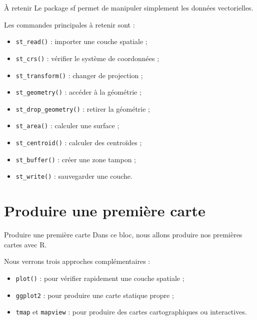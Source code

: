 \documentclass[
  10pt,
  ignorenonframetext,
]{beamer}
\begin{document}
\begin{frame}{À retenir}
\label{uxe0-retenir}
Le package sf permet de manipuler simplement les données vectorielles.

Les commandes principales à retenir sont :

\begin{itemize}
  \item \texttt{st\_read()} : importer une couche spatiale ;
  \item \texttt{st\_crs()} : vérifier le système de coordonnées ;
  \item \texttt{st\_transform()} : changer de projection ;
  \item \texttt{st\_geometry()} : accéder à la géométrie ;
  \item \texttt{st\_drop\_geometry()} : retirer la géométrie ;
  \item \texttt{st\_area()} : calculer une surface ;
  \item \texttt{st\_centroid()} : calculer des centroïdes ;
  \item \texttt{st\_buffer()} : créer une zone tampon ;
  \item \texttt{st\_write()} : sauvegarder une couche.
\end{itemize}
\end{frame}

\section{Produire une première
carte}\label{produire-une-premiuxe8re-carte}

\begin{frame}{Produire une première carte}
\label{produire-une-premiuxe8re-carte-1}
Dans ce bloc, nous allons produire nos premières cartes avec R.

Nous verrons trois approches complémentaires :

\begin{itemize}
  \item \texttt{plot()} : pour vérifier rapidement une couche spatiale ;
  \item \texttt{ggplot2} : pour produire une carte statique propre ;
  \item \texttt{tmap} et \texttt{mapview} : pour produire des cartes cartographiques ou interactives.
\end{itemize}
\end{frame}
\end{document}
